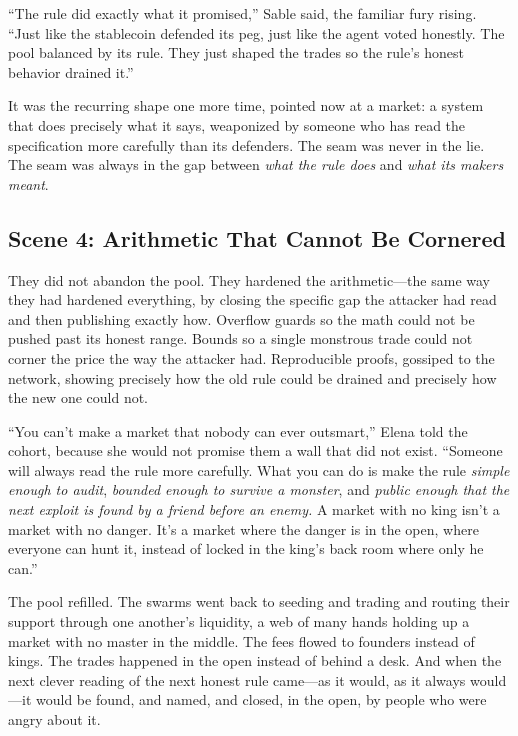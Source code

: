 ``The rule did exactly what it promised,'' Sable said, the familiar fury rising.
``Just like the stablecoin defended its peg, just like the agent voted honestly.
The pool balanced by its rule. They just shaped the trades so the rule's honest
behavior drained it.''

It was the recurring shape one more time, pointed now at a market: a system that
does precisely what it says, weaponized by someone who has read the specification
more carefully than its defenders. The seam was never in the lie. The seam was
always in the gap between \emph{what the rule does} and \emph{what its makers
meant}.

\hypertarget{scene-4-arithmetic-that-cannot-be-cornered}{%
\subsection{Scene 4: Arithmetic That Cannot Be
Cornered}\label{scene-4-arithmetic-that-cannot-be-cornered}}

They did not abandon the pool. They hardened the arithmetic---the same way they had
hardened everything, by closing the specific gap the attacker had read and then
publishing exactly how. Overflow guards so the math could not be pushed past its
honest range. Bounds so a single monstrous trade could not corner the price the way
the attacker had. Reproducible proofs, gossiped to the network, showing precisely
how the old rule could be drained and precisely how the new one could not.

``You can't make a market that nobody can ever outsmart,'' Elena told the cohort,
because she would not promise them a wall that did not exist. ``Someone will always
read the rule more carefully. What you can do is make the rule \emph{simple enough to
audit}, \emph{bounded enough to survive a monster}, and \emph{public enough that the
next exploit is found by a friend before an enemy.} A market with no king isn't a
market with no danger. It's a market where the danger is in the open, where everyone
can hunt it, instead of locked in the king's back room where only he can.''

The pool refilled. The swarms went back to seeding and trading and routing their
support through one another's liquidity, a web of many hands holding up a market with
no master in the middle. The fees flowed to founders instead of kings. The trades
happened in the open instead of behind a desk. And when the next clever reading of
the next honest rule came---as it would, as it always would---it would be found, and
named, and closed, in the open, by people who were angry about it.

